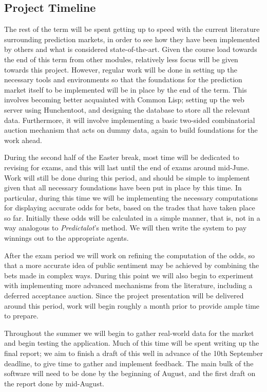 \documentclass[10pt,a4paper]{article}
\theoremstyle{plain}
\theoremstyle{definition}
\begin{document}
	\subsection{Project Timeline}

	The rest of the term will be spent getting up to speed with the current
	literature surrounding prediction markets, in order to see how they have
	been implemented by others and what is considered state-of-the-art. Given
	the course load towards the end of this term from other modules, relatively
	less focus will be given towards this project. However, regular work will
	be done in setting up the necessary tools and environments so that the
	foundations for the prediction market itself to be implemented will be in
	place by the end of the term. This involves becoming better acquainted with
	Common Lisp; setting up the web server using Hunchentoot, and designing the
	database to store all the relevant data. Furthermore, it will involve
	implementing a basic two-sided combinatorial auction mechanism that acts on
	dummy data, again to build foundations for the work ahead.

	During the second half of the Easter break, most time will be dedicated to
	revising for exams, and this will last until the end of exams around
	mid-June. Work will still be done during this period, and should be simple
	to implement given that all necessary foundations have been put in place by
	this time. In particular, during this time we will be implementing the
	necessary computations for displaying accurate odds for bets, based on the
	trades that have taken place so far. Initially these odds will be
	calculated in a simple manner, that is, not in a way analogous
	to \emph{Predictalot}'s method. We will then write the system to pay
	winnings out to the appropriate agents.

	After the exam period we will work on refining the computation of the odds,
	so that a more accurate idea of public sentiment may be achieved by
	combining the bets made in complex ways. During this point we will also
	begin to experiment with implementing more advanced mechanisms from the
	literature, including a deferred acceptance auction. Since the project
	presentation will be delivered around this period, work will begin roughly
	a month prior to provide ample time to prepare.

	Throughout the summer we will begin to gather real-world data for the
	market and begin testing the application. Much of this time will be spent
	writing up the final report; we aim to finish a draft of this well in
	advance of the 10th September deadline, to give time to gather and
	implement feedback. The main bulk of the software will need to be done by
	the beginning of August, and the first draft on the report done by
	mid-August.
\end{document}
